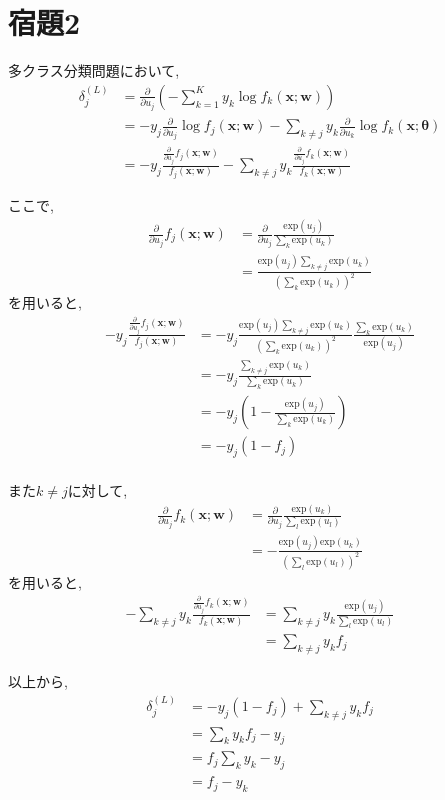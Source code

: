 \documentclass[a4paper,11pt]{jsarticle}
\renewcommand{\exp}[1]{\text{exp}\left({#1}\right)}
\begin{document}
  \section*{宿題2}
  多クラス分類問題において, 
  \begin{align*}
    \delta _j ^{(L)} &= \frac{\partial}{\partial u_j} \left( -\sum_{k=1}^K y_{k} \log{f_k({\bm x}; {\bm w})}\right)\\
    &= -y_j \frac{\partial}{\partial u_j}\log{f_j({\bm x}; {\bm w})} - \sum _{k \neq j} y_k \frac{\partial}{\partial u_k} \log{f_k({\bm x}; {\bm \theta})}\\
    &= -y_j \frac{\frac{\partial}{\partial u_j}f_j({\bm x}; {\bm w})}{f_j({\bm x}; {\bm w})} - \sum _{k\neq j} y_k \frac{\frac{\partial}{\partial u_j}f_k({\bm x}; {\bm w})}{f_k({\bm x}; {\bm w})}
  \end{align*}

  ここで, 
  \begin{align*}
    \frac{\partial}{\partial u_j} f_j({\bm x}; {\bm w}) &= \frac{\partial}{\partial u_j} \frac{\exp{u_j}}{\sum _k \exp{u_k}}\\
    &= \frac{\exp{u_j} \sum _{k\neq j} \exp{u_k} }{\left(\sum _k \exp{u_k}\right)^2}
  \end{align*}
  を用いると, 
  \begin{align*}
    -y_j \frac{\frac{\partial}{\partial u_j}f_j({\bm x}; {\bm w})}{f_j({\bm x}; {\bm w})} &= -y_j \frac{\exp{u_j}\sum _{k\neq j} \exp{u_k}}{\left(\sum _k \exp{u_k}\right)^2} \frac{\sum _k \exp{u_k}}{\exp{u_j}}\\
    &= -y_j \frac{\sum _{k\neq j} \exp{u_k}}{\sum _k \exp{u_k}}\\
    &= -y_j \left(1 - \frac{\exp{u_j}}{\sum _k \exp{u_k}}\right)\\
    &= -y_j (1-f_j)\\
  \end{align*}

  また$k \neq j$に対して, 
  \begin{align*}
    \frac{\partial}{\partial u_j} f_k({\bm x}; {\bm w}) &= \frac{\partial}{\partial u_j} \frac{\exp{u_k}}{\sum _l \exp{u_l}}\\
    &= -\frac{\exp{u_j} \exp{u_k} }{\left(\sum _l \exp{u_l}\right)^2}
  \end{align*}
  を用いると, 
  \begin{align*}
    - \sum _{k\neq j} y_k \frac{\frac{\partial}{\partial u_j}f_k({\bm x}; {\bm w})}{f_k({\bm x}; {\bm w})} &= \sum_{k\neq j} y_k \frac{\exp{u_j}}{\sum _l \exp{u_l}}\\
    &= \sum _{k \neq j} y_k f_j
  \end{align*}

  以上から, 
  \begin{align*}
    \delta _j ^{(L)} &= -y_j(1-f_j) + \sum _{k \neq j}y_k f_j \\
    &= \sum _{k} y_k f_j - y_j\\
    &= f_j\sum _k y_k - y_j\\
    &= f_j - y_k
  \end{align*}
\end{document}
